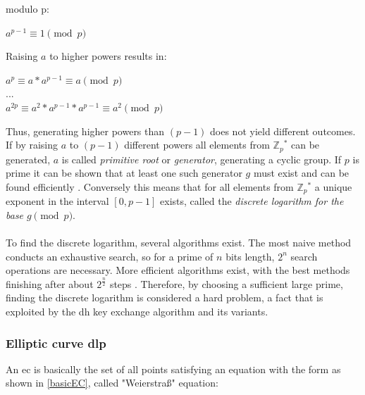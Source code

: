 modulo p:
\begin{center}
 $a^{p-1} \equiv 1 \pmod p $ \\
\end{center}
Raising $a$ to higher powers results in:
\begin{center}
 $a^{p} \equiv a*a^{p-1} \equiv a \pmod p$ \\
 $...$ \\
 $a^{2p} \equiv a^2 * a^{p-1} * a^{p-1} \equiv a^2 \pmod p$
\end{center}
Thus, generating higher powers than $(p-1)$ does not yield different outcomes. If by raising $a$ to $(p-1)$ different powers all elements from $\mathbb{Z}{_p}^*$ can
be generated, $a$ is called \textit{primitive root} or \textit{generator}, generating a cyclic group.
If $p$ is prime it can be shown that at least one such generator $g$ must exist and can be found efficiently \cite{primitiveRoot}.
Conversely this means that for all elements from  $\mathbb{Z}{_p}^*$ a unique exponent in the interval $[0, p-1]$ exists,
called the \textit{discrete logarithm for the base $ g \pmod p$}.
\\
\\
To find
the discrete logarithm, several algorithms exist. The most naive method conducts an exhaustive search, so for a prime of $n$ bits length, $2^n$ search operations
are necessary. More efficient algorithms exist, with the best methods finishing after about $2^{\frac{n}{2}}$ steps \cite{5199978}. 
Therefore, by choosing a sufficient large prime, finding the discrete logarithm is considered a hard problem, a fact
that is exploited by the \gls{dh} key exchange algorithm and its variants.

\subsubsection{Elliptic curve \gls{dlp}}\label{sec:ecIntro}
An \gls{ec} is basically the set of all points
satisfying an equation with the form as shown in \ref{basicEC}, called "Weierstraß" equation:

